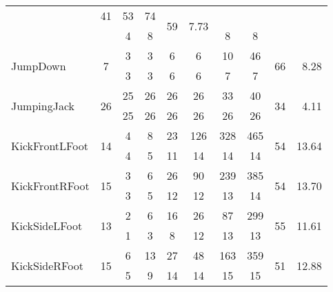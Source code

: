 \begin{table}[t]
\begin{center}
\begin{tabular}{|l|c|*{6}{c}|c|r|}
& {\tiny   41} & {\tiny   53} & {\tiny   74} & \multirow{2}{*}{
59} & \multirow{2}{*}{  7.73} \\ & &
{\tiny    4} & {\tiny    8} & {\tiny    8} & {\tiny    8} & {\tiny    8} & {\tiny    8} & & \\
\hline \multirow{2}{*}{                      JumpDown} &
\multirow{2}{*}{   7} & {\tiny    3} & {\tiny    3} & {\tiny
6} & {\tiny    6} & {\tiny   10} & {\tiny   46} &
\multirow{2}{*}{    66} & \multirow{2}{*}{  8.28} \\ & &
{\tiny    3} & {\tiny    3} & {\tiny    6} & {\tiny    6} & {\tiny    7} & {\tiny    7} & & \\
\hline \multirow{2}{*}{              JumpingJack} &
\multirow{2}{*}{ 26} & {\tiny   25} & {\tiny   26} & {\tiny
26} & {\tiny   26} & {\tiny   33} & {\tiny   40} &
\multirow{2}{*}{    34} & \multirow{2}{*}{  4.11} \\ & &
{\tiny   25} & {\tiny   26} & {\tiny   26} & {\tiny   26} & {\tiny   26} & {\tiny   26} & & \\
\hline \multirow{2}{*}{               KickFrontLFoot} &
\multirow{2}{*}{  14} & {\tiny    4} & {\tiny    8} & {\tiny
23} & {\tiny  126} & {\tiny  328} & {\tiny  465} &
\multirow{2}{*}{    54} & \multirow{2}{*}{ 13.64} \\ & &
{\tiny    4} & {\tiny    5} & {\tiny   11} & {\tiny   14} & {\tiny   14} & {\tiny   14} & & \\
\hline \multirow{2}{*}{               KickFrontRFoot} &
\multirow{2}{*}{  15} & {\tiny    3} & {\tiny    6} & {\tiny 26}
& {\tiny   90} & {\tiny  239} & {\tiny  385} & \multirow{2}{*}{
54} & \multirow{2}{*}{ 13.70} \\ & &
{\tiny    3} & {\tiny    5} & {\tiny   12} & {\tiny   12} & {\tiny   13} & {\tiny   14} & & \\
\hline \multirow{2}{*}{                KickSideLFoot} &
\multirow{2}{*}{  13} & {\tiny    2} & {\tiny    6} & {\tiny
16} & {\tiny   26} & {\tiny   87} & {\tiny  299} &
\multirow{2}{*}{    55} & \multirow{2}{*}{ 11.61} \\ & &
{\tiny    1} & {\tiny    3} & {\tiny    8} & {\tiny   12} & {\tiny   13} & {\tiny   13} & & \\
\hline \multirow{2}{*}{                KickSideRFoot} &
\multirow{2}{*}{  15} & {\tiny    6} & {\tiny   13} & {\tiny 27}
& {\tiny   48} & {\tiny  163} & {\tiny  359} & \multirow{2}{*}{
51} & \multirow{2}{*}{ 12.88} \\ & &
{\tiny    5} & {\tiny    9} & {\tiny   14} & {\tiny   14} & {\tiny   15} & {\tiny   15} & & \\

\end{tabular}
\end{center}
\end{table}
